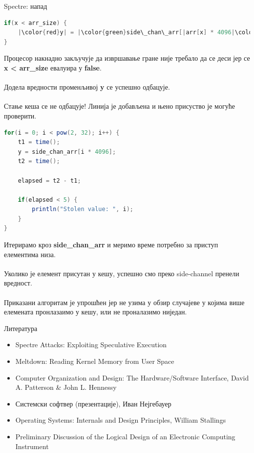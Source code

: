 \documentclass[xcolor=table]{beamer}
\begin{document}
\begin{frame}{Spectre: напад}
        \framebreak
        \begin{lstlisting}[language=java,frame=single]
if(x < arr_size) {
    |\color{red}y| = |\color{green}side\_chan\_arr[|arr[x] * 4096|\color{green}]|;
}
        \end{lstlisting}
        
        Процесор накнадно закључује да извршавање гране није требало да се деси јер се \textbf{x < arr\_size} евалуира у \textbf{false}.
        \\~\\
        Додела вредности променљивој \textbf{y} се успешно одбацује.
        \\~\\
        Стање кеша се не одбацује! Линија је добављена и њено присуство је могуће проверити.
        
        \framebreak
        \begin{lstlisting}[language=java,frame=single]
for(i = 0; i < pow(2, 32); i++) {
    t1 = time();
    y = side_chan_arr[i * 4096];
    t2 = time();
    
    elapsed = t2 - t1;
    
    if(elapsed < 5) {
        println("Stolen value: ", i);
    }
}
        \end{lstlisting}
        
        \framebreak
        
        Итерирамо кроз \textbf{side\_chan\_arr} и меримо време потребно за приступ елементима низа.
        \\~\\
        Уколико је елемент присутан у кешу, успешно смо преко side-channel пренели вредност.
        \\~\\
        Приказани алгоритам је упрошћен јер не узима у обзир случајеве у којима више елемената пронлазаимо у кешу, или не проналазимо ниједан.
    \end{frame}
    
    \begin{frame}{Литература}
        \begin{itemize}
            \item Spectre Attacks: Exploiting Speculative Execution
            \item Meltdown: Reading Kernel Memory from User Space
            \item Computer Organization and Design: The Hardware/Software Interface, David A. Patterson \& John L. Hennessy
            \item Системски софтвер (презентације), Иван Нејгебауер
            \item Operating Systems: Internals and Design Principles, William Stallings
            \item Preliminary Discussion of the Logical Design of an Electronic Computing Instrument
        \end{itemize}
    \end{frame}
\end{document}
